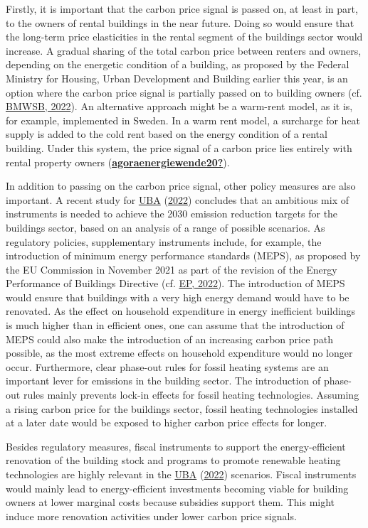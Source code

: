 \documentclass[12pt,twoside]{reedthesis}
\begin{document}
Firstly, it is important that the carbon price signal is passed on, at least in part, to the owners of rental buildings in the near future. Doing so would ensure that the long-term price elasticities in the rental segment of the buildings sector would increase. A gradual sharing of the total carbon price between renters and owners, depending on the energetic condition of a building, as proposed by the Federal Ministry for Housing, Urban Development and Building earlier this year, is an option where the carbon price signal is partially passed on to building owners (cf. \protect\hyperlink{ref-bmwsb22}{BMWSB, 2022}). An alternative approach might be a warm-rent model, as it is, for example, implemented in Sweden. In a warm rent model, a surcharge for heat supply is added to the cold rent based on the energy condition of a rental building. Under this system, the price signal of a carbon price lies entirely with rental property owners (\protect\hyperlink{ref-agoraenergiewende20}{\textbf{agoraenergiewende20?}}).

In addition to passing on the carbon price signal, other policy measures are also important. A recent study for \protect\hyperlink{ref-uba22}{UBA} (\protect\hyperlink{ref-uba22}{2022}) concludes that an ambitious mix of instruments is needed to achieve the 2030 emission reduction targets for the buildings sector, based on an analysis of a range of possible scenarios. As regulatory policies, supplementary instruments include, for example, the introduction of minimum energy performance standards (MEPS), as proposed by the EU Commission in November 2021 as part of the revision of the Energy Performance of Buildings Directive (cf. \protect\hyperlink{ref-ep22}{EP, 2022}). The introduction of MEPS would ensure that buildings with a very high energy demand would have to be renovated. As the effect on household expenditure in energy inefficient buildings is much higher than in efficient ones, one can assume that the introduction of MEPS could also make the introduction of an increasing carbon price path possible, as the most extreme effects on household expenditure would no longer occur. Furthermore, clear phase-out rules for fossil heating systems are an important lever for emissions in the building sector. The introduction of phase-out rules mainly prevents lock-in effects for fossil heating technologies. Assuming a rising carbon price for the buildings sector, fossil heating technologies installed at a later date would be exposed to higher carbon price effects for longer.

Besides regulatory measures, fiscal instruments to support the energy-efficient renovation of the building stock and programs to promote renewable heating technologies are highly relevant in the \protect\hyperlink{ref-uba22}{UBA} (\protect\hyperlink{ref-uba22}{2022}) scenarios. Fiscal instruments would mainly lead to energy-efficient investments becoming viable for building owners at lower marginal costs because subsidies support them. This might induce more renovation activities under lower carbon price signals.
\end{document}
